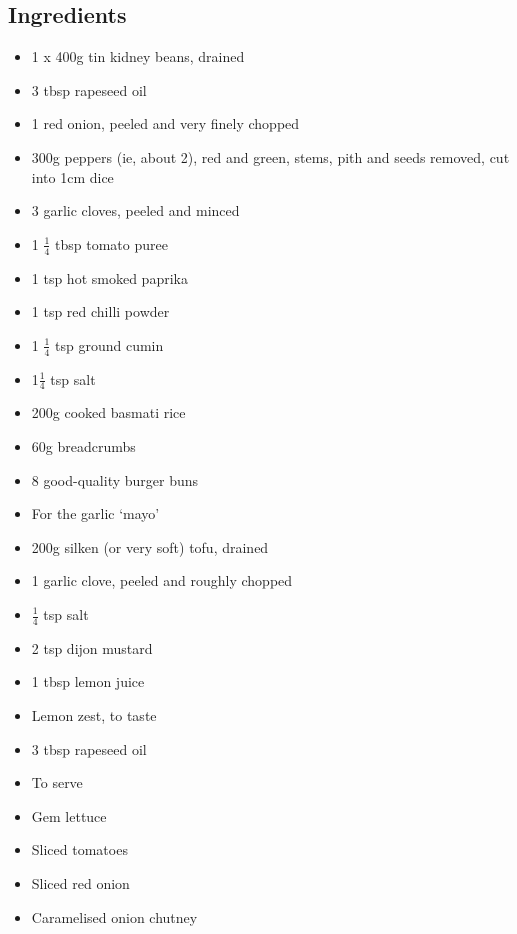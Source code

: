 \documentclass{book}
\begin{document}
\subsection*{Ingredients}
\begin{itemize}
\item 1 x 400g tin kidney beans, drained
\item 3 tbsp rapeseed oil
\item 1 red onion, peeled and very finely chopped 
\item 300g peppers (ie, about 2), red and green, stems, pith and seeds removed, cut into 1cm dice
\item 3 garlic cloves, peeled and minced 
\item 1 $\frac{1}{4}$ tbsp tomato puree
\item 1 tsp hot smoked paprika 
\item 1 tsp red chilli powder
\item 1 $\frac{1}{4}$ tsp ground cumin 
\item 1$\frac{1}{4}$ tsp salt 
\item 200g cooked basmati rice 
\item 60g breadcrumbs 
\item 8 good-quality burger buns
\end{itemize}

\begin{itemize}
\item For the garlic ‘mayo’ 
\item 200g silken (or very soft) tofu, drained
\item 1 garlic clove, peeled and roughly chopped 
\item $\frac{1}{4}$ tsp salt 
\item 2 tsp dijon mustard 
\item 1 tbsp lemon juice 
\item Lemon zest, to taste
\item 3 tbsp rapeseed oil
\end{itemize}

\begin{itemize}
\item To serve
\item Gem lettuce
\item Sliced tomatoes
\item Sliced red onion
\item Caramelised onion chutney
\end{itemize}
\end{document}
